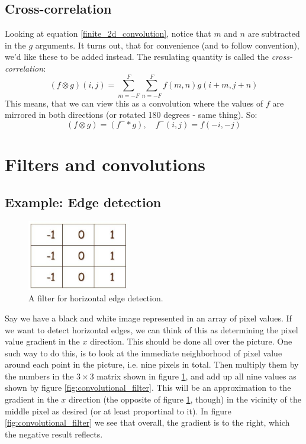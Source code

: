 \documentclass[12pt, a4paper]{article}
\numberwithin{equation}{section}
\begin{document}
\subsection{Cross-correlation}
Looking at equation \ref{finite_2d_convolution}, notice that $m$ and $n$ are subtracted in the $g$ arguments. It turns out, that for convenience (and to follow convention), we'd like these to be added instead. The resulating quantity is called the \textit{cross-correlation}:
\begin{equation}
(f\otimes g)(i,j)=\sum_{m=-F}^F\sum_{n=-F}^F f(m,n)g(i+m,j+n)
\label{cross_correlation}
\end{equation}
This means, that we can view this as a convolution where the values of $f$ are mirrored in both directions (or rotated 180 degrees - same thing). So:
\begin{equation}
(f\otimes g)=(f^-*g),\quad f^-(i,j)=f(-i,-j)
\end{equation}

\section{Filters and convolutions}

\subsection{Example: Edge detection}

\begin{figure}
\centering
\includegraphics[width=0.4\textwidth]{horizontal_edge}
\caption{A filter for horizontal edge detection.}
\label{fig:horizontal_edge}
\end{figure}

Say we have a black and white image represented in an array of pixel values. If we want to detect horizontal edges, we can think of this as determining the pixel value gradient in the $x$ direction. This should be done all over the picture. One such way to do this, is to look at the immediate neighborhood of pixel value around each point in the picture, i.e. nine pixels in total. Then multiply them by the numbers in the $3\times 3$ matrix shown in figure \ref{fig:horizontal_edge}, and add up all nine values as shown by figure \ref{fig:convolutional_filter}. This will be an approximation to the gradient in the $x$ direction (the opposite of figure \ref{fig:horizontal_edge}, though) in the vicinity of the middle pixel as desired (or at least proportinal to it). In figure \ref{fig:convolutional_filter} we see that overall, the gradient is to the right, which the negative result reflects.
\end{document}

